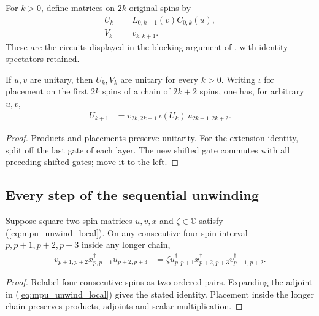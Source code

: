 \begin{definition}
    \label{def:mpu_printed_circuits}
    \leanok
    For $k>0$, define matrices on $2k$ original spins by
    \begin{align*}
        U_k & =L_{0,k-1}(v)C_{0,k}(u), \\
        V_k & =v_{k,k+1}.
    \end{align*}
    These are the circuits displayed in the blocking argument of
    \cite{Cirac2017MPU}, with identity spectators retained.
\end{definition}

\begin{lemma}
    \label{lem:mpu_printed_circuit_extension}
    \leanok
    If $u,v$ are unitary, then $U_k,V_k$ are unitary for every $k>0$.
    Writing $\iota$ for placement on the first $2k$ spins of a chain of
    $2k+2$ spins, one has, for arbitrary $u,v$,
    \begin{align*}
        U_{k+1} & =v_{2k,2k+1}\,\iota(U_k)\,u_{2k+1,2k+2}.
    \end{align*}
\end{lemma}
\begin{proof}\leanok
    Products and placements preserve unitarity. For the extension
    identity, split off the last gate of each layer. The new shifted gate
    commutes with all preceding shifted gates; move it to the left.
\end{proof}

\subsection{Every step of the sequential unwinding}

\begin{lemma}
    \label{lem:mpu_printed_window_unwind}
    \leanok
    Suppose square two-spin matrices $u,v,x$ and $\zeta\in\mathbb C$
    satisfy (\ref{eq:mpu_unwind_local}). On any consecutive four-spin
    interval $p,p+1,p+2,p+3$ inside any longer chain,
    \begin{align*}
        v_{p+1,p+2}x_{p,p+1}^\dagger u_{p+2,p+3}
         & =\zeta u_{p,p+1}^\dagger x_{p+2,p+3}^\dagger v_{p+1,p+2}^\dagger.
    \end{align*}
\end{lemma}
\begin{proof}\leanok
    Relabel four consecutive spins as two ordered pairs. Expanding the
    adjoint in (\ref{eq:mpu_unwind_local}) gives the stated identity.
    Placement inside the longer chain preserves products, adjoints and
    scalar multiplication.
\end{proof}

